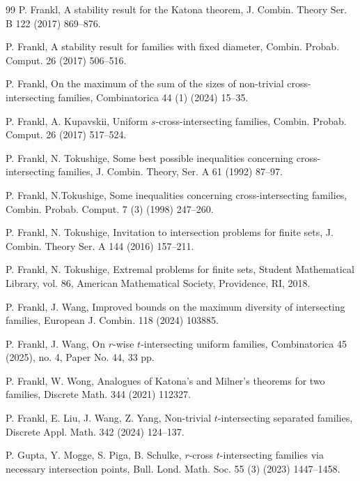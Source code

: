 \documentclass[11pt,a4paper]{article}
\begin{document}
\begin{thebibliography}{99}
P. Frankl, A stability result for the Katona theorem, 
J. Combin. Theory Ser. B 122 (2017) 869--876. 

P. Frankl, A stability result for families with fixed diameter, Combin. Probab. Comput. 26 (2017) 506--516.

 P. Frankl, 
 On the maximum of the sum of the sizes of non-trivial cross-intersecting families, 
 Combinatorica 44 (1)  (2024) 15--35. 

P. Frankl, A. Kupavskii, 
Uniform $s$-cross-intersecting families, 
Combin. Probab. Comput. 26 (2017) 517--524.


 P. Frankl,  N. Tokushige, Some best possible inequalities concerning cross-intersecting families, J. Combin. Theory, Ser. A 61 (1992) 87--97.

P. Frankl, N.Tokushige,  Some inequalities concerning cross-intersecting families, 
Combin. Probab. Comput. 7 (3) (1998) 247--260.



P. Frankl, N. Tokushige, Invitation to intersection problems for finite sets, J. Combin. Theory Ser. A 144 (2016) 157--211. 


P. Frankl, N. Tokushige, Extremal problems for finite sets, Student Mathematical Library, vol. 86, American Mathematical Society, Providence, RI, 2018. 
 

  P. Frankl, J. Wang, 
 Improved bounds on the maximum diversity of intersecting families, 
European J. Combin. 118 (2024) 103885. 

P. Frankl, J. Wang,  
On $r$-wise $t$-intersecting uniform families,  {  Combinatorica 45 (2025), no. 4, Paper No. 44, 33 pp.}  

P. Frankl, W. Wong, Analogues of Katona's and Milner's theorems for two families,  
Discrete Math. 344 (2021) 112327. 


P. Frankl, E. Liu, J. Wang, Z. Yang,
Non-trivial $t$-intersecting separated families, 
Discrete Appl. Math. 342 (2024) 124--137.


P. Gupta, Y. Mogge, S. Piga, B. Schulke,  
$r$-cross $t$-intersecting families via necessary intersection points, 
Bull. Lond. Math. Soc. 55 (3) (2023) 1447--1458.


\end{thebibliography}
\end{document}
